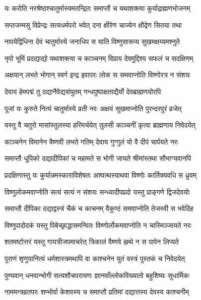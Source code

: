\twolineshloka
{यः करोति नरश्रेष्ठश्चातुर्मास्यमतन्द्रितः}
{समाप्तौ च यथाशक्त्या कुर्याद्राह्मणभोजनम्} %

\twolineshloka
{सप्तजन्मसु विप्रेन्द्रः सत्यधर्मपरो भवेत्}
{दना क्षीरेण चाज्येन क्षौद्रेण सितया तथा} %

\twolineshloka
{नापयेद्विधिना देवं चातुर्मास्ये जनाधिप}
{स याति विष्णुसारूप्य सुखमक्षय्यमश्नुते} %

\twolineshloka
{नृपो भूमिं प्रदद्याद्यो यथाशक्त्या च काञ्चनम्}
{विप्राय देवमुद्दिश्य सफलं च सदक्षिणम्} %

\twolineshloka
{अक्षयान् लभते भोगान् स्वर्ग इन्द्र इवापरः}
{लोक स समवाप्नोति विष्णोरत्र न संशयः} %

\twolineshloka
{देवाय हेमपद्मं तु दद्यानैवेद्यसंयुतम्}
{गन्धपुष्पाक्षताद्यैर्यो देवब्राह्मणयोरपि} %

\twolineshloka
{पूजां यः कुरुते नित्यं चातुर्मास्ये व्रती नरः}
{अक्षयं सुखमाप्नोति पुरन्दरपुरं व्रजेत्} %

\twolineshloka
{यस्तु वै चतुरो मासांस्तुलस्या हरिमर्चयेत्}
{तुलसी काञ्चनीं कृत्वा ब्राह्मणाय निवेदयेत्} %

\twolineshloka
{काञ्चनेन विमानेन वैष्णवी लभते गतिम्}
{देवाय गुग्गुलं यो वै दीपं चार्पयते नरः} %

\twolineshloka
{समाप्तौ धूपिको दद्यादीपिकां च महामते}
{स भोगी जायते श्रीमांस्तथा सौभाग्यवानपि} %

\twolineshloka
{प्रदक्षिणास्तु यः कुर्यान्नमस्काराविशेषतः}
{अश्वत्थस्याथवा विष्णोः कार्तिक्यवधि स ध्रुवम्} %

\twolineshloka
{विष्णुलोकमवाप्नोति सत्यं सत्यं न संशयः}
{सन्ध्यादीपप्रदो यस्तु प्राङ्गणे द्विजदेवयोः} %

\twolineshloka
{समाप्तौ दीपिका दद्याद्वस्त्रं चैकं च काचनम्}
{वैकुण्ठं समवाप्नोति तेजस्वी स भवेदिह} %

\twolineshloka
{विष्णुपादोदकं यस्तु पिबेच्छ्राद्धासमन्वितः}
{विष्णोर्लोकमवाप्नोति न चास्मिञ्जायते नरः} %

\twolineshloka
{शतमष्टोत्तरं यस्तु गायत्रीजपमाचरेत्}
{त्रिकालं वैष्णवे हम्र्थे न स पापेन लिप्यते} %

\twolineshloka
{पुराणं शृणुयानित्यं धर्मशास्त्रमथापि वा}
{काश्चनेन युतं वस्त्रं पुस्तकं च निवेदयेत्} %

\twolineshloka
{पुण्यवान् धनवान्भोगी सत्यशौचपरायणः}
{ज्ञानवाँल्लोकविख्यातो बहुशिष्यः सुधार्मिकः} %

\twolineshloka
{नाममन्त्रव्रतपरः शम्भोर्वा केशवस्य च}
{समाप्तौ प्रतिमां दद्यात्तस्य देवस्य काश्चनीम्} %


